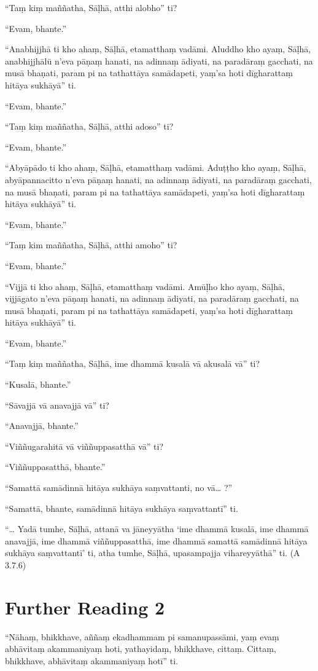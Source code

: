 “Taṃ kiṃ maññatha, Sāḷhā, atthi alobho” ti?

“Evam, bhante.”

“Anabhijjhā ti kho ahaṃ, Sāḷhā, etamatthaṃ vadāmi. Aluddho kho ayaṃ, Sāḷhā, anabhijjhālū n’eva pāṇaṃ hanati, na adinnaṃ ādiyati, na paradāraṃ gacchati, na musā bhaṇati, param pi na tathattāya samādapeti, yaṃ’sa hoti dīgharattaṃ hitāya sukhāyā” ti.

“Evam, bhante.”

“Taṃ kiṃ maññatha, Sāḷhā, atthi adoso” ti?

“Evam, bhante.”

“Abyāpādo ti kho ahaṃ, Sāḷhā, etamatthaṃ vadāmi. Aduṭṭho kho ayaṃ, Sāḷhā, abyāpannacitto n’eva pāṇaṃ hanati, na adinnaṃ ādiyati, na paradāraṃ gacchati, na musā bhaṇati, param pi na tathattāya samādapeti, yaṃ’sa hoti dīgharattaṃ hitāya sukhāyā” ti.

“Evam, bhante.”

“Taṃ kim maññatha, Sāḷhā, atthi amoho” ti?

“Evam, bhante.”

“Vijjā ti kho ahaṃ, Sāḷhā, etamatthaṃ vadāmi. Amūḷho kho ayaṃ, Sāḷhā, vijjāgato n’eva pāṇaṃ hanati, na adinnaṃ ādiyati, na paradāraṃ gacchati, na musā bhaṇati, param pi na tathattāya samādapeti, yaṃ’sa hoti dīgharattaṃ hitāya sukhāyā” ti.

“Evam, bhante.”

“Taṃ kiṃ maññatha, Sāḷhā, ime dhammā kusalā vā akusalā vā” ti?

“Kusalā, bhante.”

“Sāvajjā vā anavajjā vā” ti?

“Anavajjā, bhante.”

“Viññugarahitā vā viññuppasatthā vā” ti?

“Viññuppasatthā, bhante.”

“Samattā samādinnā hitāya sukhāya saṃvattanti, no vā… ?”

“Samattā, bhante, samādinnā hitāya sukhāya saṃvattantī” ti.

“… Yadā tumhe, Sāḷhā, attanā va jāneyyātha ‘ime dhammā kusalā, ime dhammā anavajjā, ime dhammā viññuppasatthā, ime dhammā samattā samādinnā hitāya sukhāya saṃvattantī’ ti, atha tumhe, Sāḷhā, upasampajja vihareyyāthā” ti. (A 3.7.6)

\section*{Further Reading 2}

“Nāhaṃ, bhikkhave, aññaṃ ekadhammam pi samanupassāmi, yaṃ evaṃ abhāvitaṃ akammaniyaṃ hoti, yathayidaṃ, bhikkhave, cittaṃ. Cittaṃ, bhikkhave, abhāvitaṃ akammaniyaṃ hotī” ti.

